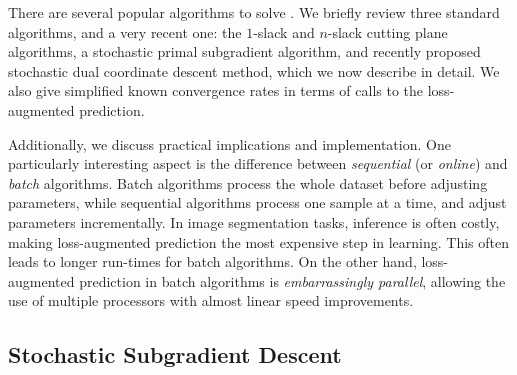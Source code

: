 There are several popular algorithms to solve . We
briefly review three standard algorithms, and a very recent one: the
$1$-slack and $n$-slack cutting plane algorithms, a stochastic primal subgradient
algorithm, and recently proposed stochastic dual coordinate descent method,
which we now describe in detail. We also give simplified known
convergence rates in terms of calls to the loss-augmented prediction.

Additionally, we discuss practical implications and implementation.  One
particularly interesting aspect is the difference between \emph{sequential}
(or \emph{online}) and \emph{batch} algorithms.  Batch algorithms process the
whole dataset before adjusting parameters, while sequential algorithms process
one sample at a time, and adjust parameters incrementally.
In image segmentation tasks, inference is often costly, making loss-augmented
prediction the most expensive step in learning. This often leads to longer
run-times for batch algorithms. On the other hand, loss-augmented prediction in
batch algorithms is \emph{embarrassingly parallel}, allowing the use of multiple
processors with almost linear speed improvements.

\subsection{Stochastic Subgradient Descent}

